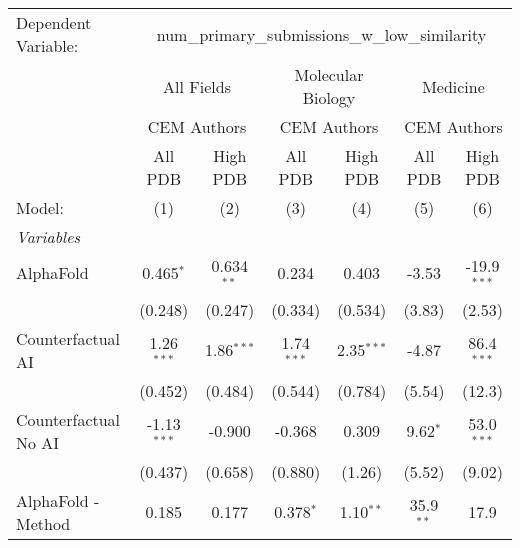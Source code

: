 \begingroup
\centering
\begin{tabular}{lcccccc}
   \tabularnewline \midrule \midrule
   Dependent Variable: & \multicolumn{6}{c}{num\_primary\_submissions\_w\_low\_similarity}\\
 & \multicolumn{2}{c}{All Fields} & \multicolumn{2}{c}{Molecular Biology} & \multicolumn{2}{c}{Medicine} \\
\cmidrule(lr){2-3} \cmidrule(lr){4-5} \cmidrule(lr){6-7}
 & \multicolumn{2}{c}{CEM Authors} & \multicolumn{2}{c}{CEM Authors} & \multicolumn{2}{c}{CEM Authors} \\
\cmidrule(lr){2-3} \cmidrule(lr){4-5} \cmidrule(lr){6-7}
 & \multicolumn{1}{c}{All PDB} & \multicolumn{1}{c}{High PDB} & \multicolumn{1}{c}{All PDB} & \multicolumn{1}{c}{High PDB} & \multicolumn{1}{c}{All PDB} & \multicolumn{1}{c}{High PDB} \\
\cmidrule(lr){2-2} \cmidrule(lr){3-3} \cmidrule(lr){4-4} \cmidrule(lr){5-5} \cmidrule(lr){6-6} \cmidrule(lr){7-7}
   Model:                                                     & (1)           & (2)           & (3)           & (4)           & (5)         & (6)\\  
   \midrule
   \emph{Variables}\\
   AlphaFold                                                  & 0.465$^{*}$   & 0.634$^{**}$  & 0.234         & 0.403         & -3.53       & -19.9$^{***}$\\   
                                                              & (0.248)       & (0.247)       & (0.334)       & (0.534)       & (3.83)      & (2.53)\\   
   Counterfactual AI                                          & 1.26$^{***}$  & 1.86$^{***}$  & 1.74$^{***}$  & 2.35$^{***}$  & -4.87       & 86.4$^{***}$\\   
                                                              & (0.452)       & (0.484)       & (0.544)       & (0.784)       & (5.54)      & (12.3)\\   
   Counterfactual No AI                                       & -1.13$^{***}$ & -0.900        & -0.368        & 0.309         & 9.62$^{*}$  & 53.0$^{***}$\\   
                                                              & (0.437)       & (0.658)       & (0.880)       & (1.26)        & (5.52)      & (9.02)\\   
   AlphaFold - Method                                         & 0.185         & 0.177         & 0.378$^{*}$   & 1.10$^{**}$   & 35.9$^{**}$ & 17.9\\   

\end{tabular}
